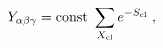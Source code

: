 \begin{equation}
Y_{\alpha \beta \gamma}= {\rm const}~ \sum_{X_{\rm cl}} e^{-S_{\rm cl}} \;,
\end{equation}

